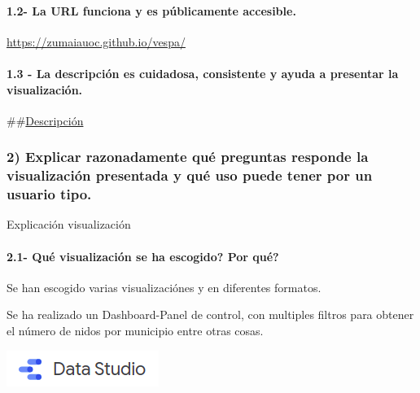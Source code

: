 \documentclass[
]{article}
\begin{document}
\hypertarget{la-url-funciona-y-es-puxfablicamente-accesible.}{%
\paragraph{1.2- La URL funciona y es públicamente
accesible.}\label{la-url-funciona-y-es-puxfablicamente-accesible.}}

\url{https://zumaiauoc.github.io/vespa/}

\hypertarget{la-descripciuxf3n-es-cuidadosa-consistente-y-ayuda-a-presentar-la-visualizaciuxf3n.}{%
\paragraph{1.3 - La descripción es cuidadosa, consistente y ayuda a
presentar la
visualización.}\label{la-descripciuxf3n-es-cuidadosa-consistente-y-ayuda-a-presentar-la-visualizaciuxf3n.}}

\#\#\href{https://github.com/zumaiaUOC/vespa/blob/main/index.md}{Descripción}

\pagebreak

\hypertarget{explicar-razonadamente-quuxe9-preguntas-responde-la-visualizaciuxf3n-presentada-y-quuxe9-uso-puede-tener-por-un-usuario-tipo.}{%
\subsubsection{2) Explicar razonadamente qué preguntas responde la
visualización presentada y qué uso puede tener por un usuario
tipo.}\label{explicar-razonadamente-quuxe9-preguntas-responde-la-visualizaciuxf3n-presentada-y-quuxe9-uso-puede-tener-por-un-usuario-tipo.}}

Explicación visualización

\hypertarget{quuxe9-visualizaciuxf3n-se-ha-escogido-por-quuxe9}{%
\paragraph{2.1- Qué visualización se ha escogido? Por
qué?}\label{quuxe9-visualizaciuxf3n-se-ha-escogido-por-quuxe9}}

Se han escogido varias visualizaciónes y en diferentes formatos.

Se ha realizado un Dashboard-Panel de control, con multiples filtros
para obtener el número de nidos por municipio entre otras cosas.

\href{https://oscar-rojo-martin.shinyapps.io/Vespa/}{\includegraphics{img/datastudio.png}}
\end{document}
